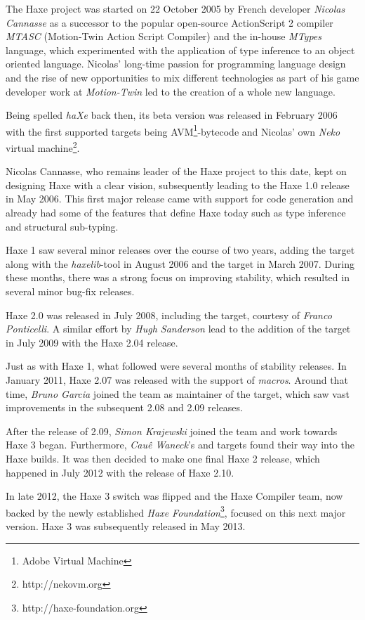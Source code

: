 The Haxe project was started on 22 October 2005 by French developer \emph{Nicolas Cannasse} as a successor to the popular open-source ActionScript 2 compiler \emph{MTASC} (Motion-Twin Action Script Compiler) and the in-house \emph{MTypes} language, which experimented with the application of type inference to an object oriented language. Nicolas' long-time passion for programming language design and the rise of new opportunities to mix different technologies as part of his game developer work at \emph{Motion-Twin} led to the creation of a whole new language.

Being spelled \emph{haXe} back then, its beta version was released in February 2006 with the first supported targets being AVM\footnote{Adobe Virtual Machine}-bytecode and Nicolas' own \emph{Neko} virtual machine\footnote{http://nekovm.org}.

Nicolas Cannasse, who remains leader of the Haxe project to this date, kept on designing Haxe with a clear vision, subsequently leading to the Haxe 1.0 release in May 2006. This first major release came with support for  code generation and already had some of the features that define Haxe today such as type inference and structural sub-typing.

Haxe 1 saw several minor releases over the course of two years, adding the  target along with the \emph{haxelib}-tool in August 2006 and the  target in March 2007. During these months, there was a strong focus on improving stability, which resulted in several minor bug-fix releases.

Haxe 2.0 was released in July 2008, including the  target, courtesy of \emph{Franco Ponticelli}. A similar effort by \emph{Hugh Sanderson} lead to the addition of the  target in July 2009 with the Haxe 2.04 release.

Just as with Haxe 1, what followed were several months of stability releases. In January 2011, Haxe 2.07 was released with the support of \emph{macros}. Around that time, \emph{Bruno Garcia} joined the team as maintainer of the  target, which saw vast improvements in the subsequent 2.08 and 2.09 releases.

After the release of 2.09, \emph{Simon Krajewski} joined the team and work towards Haxe 3 began. Furthermore, \emph{Cau\^{e} Waneck}'s  and  targets found their way into the Haxe builds. It was then decided to make one final Haxe 2 release, which happened in July 2012 with the release of Haxe 2.10.

In late 2012, the Haxe 3 switch was flipped and the Haxe Compiler team, now backed by the newly established \emph{Haxe Foundation}\footnote{http://haxe-foundation.org}, focused on this next major version. Haxe 3 was subsequently released in May 2013.
